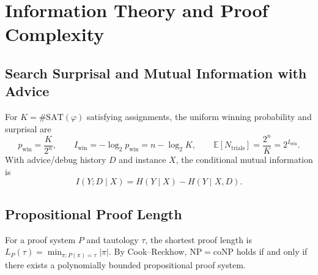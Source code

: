 \documentclass[11pt]{article}
\begin{document}
\section{Information Theory and Proof Complexity}
\subsection{Search Surprisal and Mutual Information with Advice}
For $K = \#\mathrm{SAT}(\varphi)$ satisfying assignments, the uniform winning probability and surprisal are
\begin{equation}
p_{\mathrm{win}} = \frac{K}{2^n}, \qquad I_{\mathrm{win}} = -\log_2 p_{\mathrm{win}} = n - \log_2 K, \qquad \mathbb{E}[N_{\mathrm{trials}}] = \frac{2^n}{K} = 2^{I_{\mathrm{win}}}.
\end{equation}
With advice/debug history $D$ and instance $X$, the conditional mutual information is
\begin{equation}
I(Y; D \mid X) = H(Y \mid X) - H(Y \mid X, D).
\end{equation}

\subsection{Propositional Proof Length}
For a proof system $P$ and tautology $\tau$, the shortest proof length is $L_P(\tau) = \min_{\pi : P(\pi)=\tau} |\pi|$. By Cook--Reckhow, $\mathrm{NP} = \mathrm{coNP}$ holds if and only if there exists a polynomially bounded propositional proof system.
\end{document}
